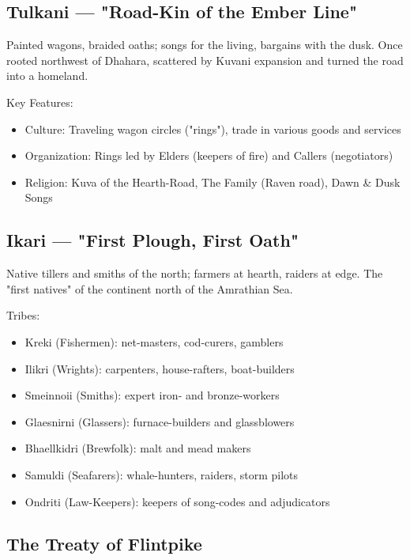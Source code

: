 \subsection{Tulkani — "Road-Kin of the Ember Line"}
\label{sec:tulkani}

Painted wagons, braided oaths; songs for the living, bargains with the dusk. Once rooted northwest of Dhahara, scattered by Kuvani expansion and turned the road into a homeland.

Key Features:
\begin{itemize}
    \item Culture: Traveling wagon circles ("rings"), trade in various goods and services
    \item Organization: Rings led by Elders (keepers of fire) and Callers (negotiators)
    \item Religion: Kuva of the Hearth-Road, The Family (Raven road), Dawn \& Dusk Songs
\end{itemize}

\subsection{Ikari — "First Plough, First Oath"}
\label{sec:ikari}

Native tillers and smiths of the north; farmers at hearth, raiders at edge. The "first natives" of the continent north of the Amrathian Sea.

Tribes:
\begin{itemize}
    \item Kreki (Fishermen): net-masters, cod-curers, gamblers
    \item Ilikri (Wrights): carpenters, house-rafters, boat-builders
    \item Smeinnoii (Smiths): expert iron- and bronze-workers
    \item Glaesnirni (Glassers): furnace-builders and glassblowers
    \item Bhaellkidri (Brewfolk): malt and mead makers
    \item Samuldi (Seafarers): whale-hunters, raiders, storm pilots
    \item Ondriti (Law-Keepers): keepers of song-codes and adjudicators
\end{itemize}

\subsection{The Treaty of Flintpike}
\label{sec:flintpike}

